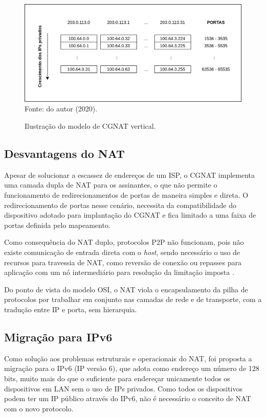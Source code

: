     \begin{figure}[!htb]
        \centering
        \caption{Ilustração do modelo de CGNAT vertical.} 
        \label{fig:cgnat_vertical} 
        \includegraphics[width=0.9\linewidth]{img/CGNAT-Vertical.png} \\
        {\small Fonte: do autor (2020).} 
    \end{figure}

\subsection{Desvantagens do NAT}

    Apesar de solucionar a escassez de endereços de um ISP, o CGNAT implementa uma camada dupla de NAT para os assinantes, o que não permite o funcionamento de redirecionamentos de portas de maneira simples e direta. O redirecionamento de portas nesse cenário, necessita da compatibilidade do dispositivo adotado para implantação do CGNAT e fica limitado a uma faixa de portas definida pelo mapeamento.
    
    Como consequência do NAT duplo, protocolos P2P não funcionam, pois não existe comunicação de entrada direta com o \textit{host}, sendo necessário o uso de recursos para travessia de NAT, como reversão de conexão ou repasses para aplicação com um nó intermediário para resolução da limitação imposta \cite{kurose2014}.
    
    Do ponto de vista do modelo OSI, o NAT viola o encapsulamento da pilha de protocolos por trabalhar em conjunto nas camadas de rede e de transporte, com a tradução entre IP e porta, sem hierarquia. 
    
\subsection{Migração para IPv6}
    
    Como solução aos problemas estruturais e operacionais do NAT, foi proposta a migração para o IPv6 (IP versão 6), que adota como endereço um número de 128 bits, muito mais do que o suficiente para endereçar unicamente todos os dispositivos em LAN sem o uso de IPs privados. Como todos os dispositivos podem ter um IP público através do IPv6, não é necessário o conceito de NAT com o novo protocolo.
    
